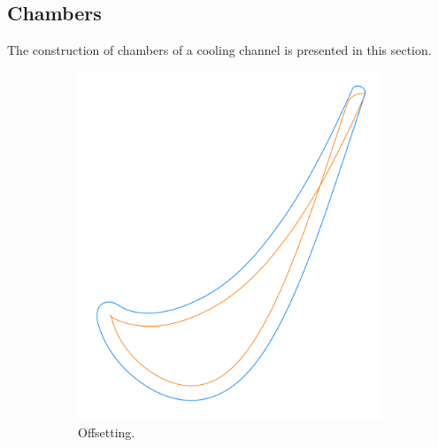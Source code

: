 \documentclass[a4paper, 11pt]{report}
\theoremstyle{definition}
\begin{document}
\subsection{Chambers}\label{sec:chambers}
	The construction of chambers of a cooling channel is presented in this section.

	\begin{figure}[H]
		\centering
		\begin{subfigure}{.32\textwidth}
			\includegraphics[width=\textwidth]{../tec/shrinking/61.png}
			\caption{Offsetting.}
		\end{subfigure}
		\begin{subfigure}{.32\textwidth}

\end{subfigure}
\end{figure}
\end{document}
